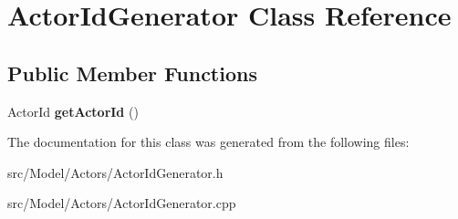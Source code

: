 \hypertarget{classActorIdGenerator}{}\section{Actor\+Id\+Generator Class Reference}
\label{classActorIdGenerator}
\subsection*{Public Member Functions}
\begin{DoxyCompactItemize}
\item 
Actor\+Id {\bfseries get\+Actor\+Id} ()\hypertarget{classActorIdGenerator_a7076d70292edf2a2a04aaafb8c86415e}{}\label{classActorIdGenerator_a7076d70292edf2a2a04aaafb8c86415e}

\end{DoxyCompactItemize}


The documentation for this class was generated from the following files\+:\begin{DoxyCompactItemize}
\item 
src/\+Model/\+Actors/Actor\+Id\+Generator.\+h\item 
src/\+Model/\+Actors/Actor\+Id\+Generator.\+cpp\end{DoxyCompactItemize}
